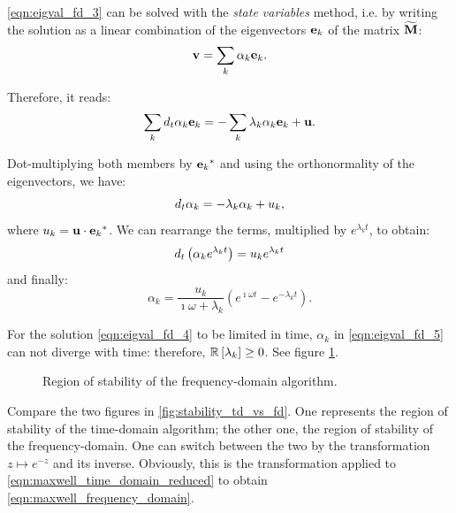 \eqref{eqn:eigval_fd_3} can be solved with the \emph{state variables}
method, i.e. by writing the solution as a linear combination of the
eigenvectors $\mathbf{e}_k$ of the matrix $\widetilde{\mathbf{M}}$:
\begin{equation} \label{eqn:eigval_fd_4}
  \mathbf{v} = \sum_k \alpha_k \mathbf{e}_k .
\end{equation}

Therefore, it reads:
\begin{equation*}
  \sum_k d_t \alpha_k \mathbf{e}_k = -\sum_k \lambda_k \alpha_k
  \mathbf{e}_k + \mathbf{u} .
\end{equation*}

Dot-multiplying both members by ${{\mathbf{e}_k}^*}$ and using the
orthonormality of the eigenvectors, we have:
\begin{equation*}
  d_t \alpha_k = -\lambda_k \alpha_k + u_k ,
\end{equation*}
where $u_k = {\mathbf{u} \cdot {{\mathbf{e}_k}^*}}$. We can
rearrange the terms, multiplied by $e^{\lambda_k t}$, to obtain:
\begin{equation*}
  d_t \left( \alpha_k e^{\lambda_k t} \right) = u_k e^{\lambda_k t}
\end{equation*}
and finally:
\begin{equation*} \label{eqn:eigval_fd_5}
  \alpha_k = \frac{u_k}{\imath \omega + \lambda_k} \left( e^{\imath
  \omega t} - e^{-\lambda_k t} \right) .
\end{equation*}

For the solution \eqref{eqn:eigval_fd_4} to be limited in time,
$\alpha_k$ in \eqref{eqn:eigval_fd_5} can not diverge with
time: therefore, ${\mathbb{R}\left[\lambda_k\right]} \geq 0$. See figure
\ref{fig:stability_fd}.

\begin{figure}[htbp]
  \begin{center}
    \resizebox{6cm}{!}{}
  \end{center}
  \caption{Region of stability of the frequency-domain algorithm.}
  \label{fig:stability_fd}
\end{figure}

Compare the two figures in \ref{fig:stability_td_vs_fd}. One
represents the region of stability of the time-domain algorithm; the
other one, the region of stability of the frequency-domain. One can
switch between the two by the transformation $z \mapsto e^{-z}$ and
its inverse. Obviously, this is the transformation applied to
\eqref{eqn:maxwell_time_domain_reduced} to obtain
\eqref{eqn:maxwell_frequency_domain}.

